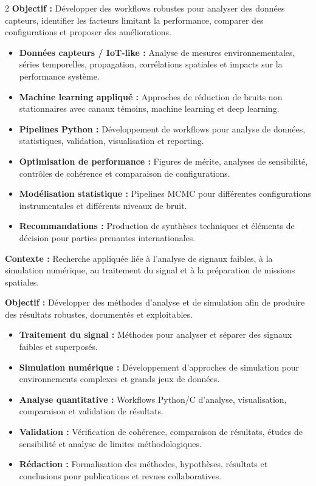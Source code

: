 \documentclass[8pt,a4paper,ragged2e,withhyper]{altacv}
\begin{document}
\begin{paracol}{2}
\textbf{Objectif :} Développer des workflows robustes pour analyser des données capteurs, identifier les facteurs limitant la performance, comparer des configurations et proposer des améliorations.

\begin{itemize}
  \item \textbf{Données capteurs / IoT-like :} Analyse de mesures environnementales, séries temporelles, propagation, corrélations spatiales et impacts sur la performance système.
  \item \textbf{Machine learning appliqué :} Approches de réduction de bruits non stationnaires avec canaux témoins, machine learning et deep learning.
  \item \textbf{Pipelines Python :} Développement de workflows pour analyse de données, statistiques, validation, visualisation et reporting.
  \item \textbf{Optimisation de performance :} Figures de mérite, analyses de sensibilité, contrôles de cohérence et comparaison de configurations.
  \item \textbf{Modélisation statistique :} Pipelines MCMC pour différentes configurations instrumentales et différents niveaux de bruit.
  \item \textbf{Recommandations :} Production de synthèses techniques et éléments de décision pour parties prenantes internationales.
\end{itemize}

\divider


\textbf{Contexte :} Recherche appliquée liée à l'analyse de signaux faibles, à la simulation numérique, au traitement du signal et à la préparation de missions spatiales.

\textbf{Objectif :} Développer des méthodes d'analyse et de simulation afin de produire des résultats robustes, documentés et exploitables.

\begin{itemize}
  \item \textbf{Traitement du signal :} Méthodes pour analyser et séparer des signaux faibles et superposés.
  \item \textbf{Simulation numérique :} Développement d'approches de simulation pour environnements complexes et grands jeux de données.
  \item \textbf{Analyse quantitative :} Workflows Python/C d'analyse, visualisation, comparaison et validation de résultats.
  \item \textbf{Validation :} Vérification de cohérence, comparaison de résultats, études de sensibilité et analyse de limites méthodologiques.
  \item \textbf{Rédaction :} Formalisation des méthodes, hypothèses, résultats et conclusions pour publications et revues collaboratives.
\end{itemize}


\end{paracol}
\end{document}
